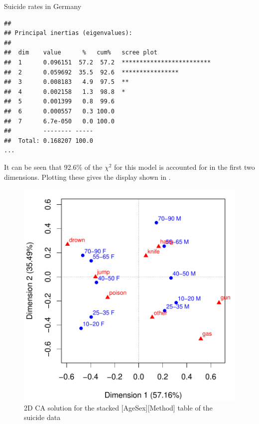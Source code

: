 \documentclass[11pt]{book}
\renewenvironment{knitrout}{\small\renewcommand{\baselinestretch}{.85}}{} %
\begin{document}
\begin{Example}[suicide1]{Suicide rates in Germany}
\begin{knitrout}
\begin{kframe}
\begin{verbatim}
## 
## Principal inertias (eigenvalues):
## 
##  dim    value      %   cum%   scree plot               
##  1      0.096151  57.2  57.2  *************************
##  2      0.059692  35.5  92.6  ****************         
##  3      0.008183   4.9  97.5  **                       
##  4      0.002158   1.3  98.8  *                        
##  5      0.001399   0.8  99.6                           
##  6      0.000557   0.3 100.0                           
##  7      6.7e-050   0.0 100.0                           
##         -------- -----                                 
##  Total: 0.168207 100.0                                 
...
\end{verbatim}
\end{kframe}
\end{knitrout}
It can be seen that 92.6\% of the $\chi^2$ for this model is accounted for in
the first two dimensions.  Plotting these gives the display shown in 
.

\begin{knitrout}
\color{fgcolor}\begin{kframe}
\begin{alltt}
\end{alltt}
\end{kframe}\begin{figure}[!htbp]


\centerline{\includegraphics[width=.7\textwidth]{ch06/fig/ca-suicide-plot} }

\caption[2D CA solution for the stacked AgeSex, Method table of the suicide data]{2D CA solution for the stacked [AgeSex][Method] table of the suicide data\label{fig:ca-suicide-plot}}
\end{figure}



\end{knitrout}
\end{Example}
\end{document}
